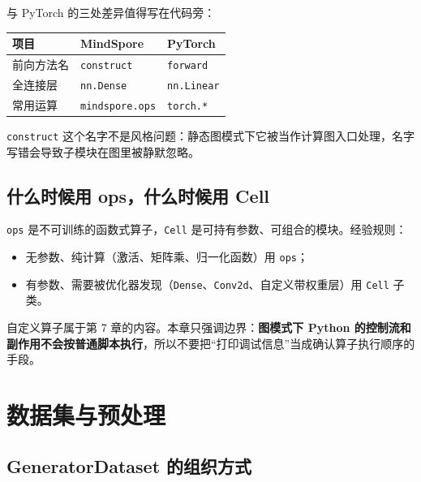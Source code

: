 与 PyTorch 的三处差异值得写在代码旁：

\begin{longtable}[]{@{}lll@{}}
\toprule\noalign{}
项目 & MindSpore & PyTorch \\
\midrule\noalign{}
\endhead
\bottomrule\noalign{}
\endlastfoot
前向方法名 & \passthrough{\lstinline!construct!} &
\passthrough{\lstinline!forward!} \\
全连接层 & \passthrough{\lstinline!nn.Dense!} &
\passthrough{\lstinline!nn.Linear!} \\
常用运算 & \passthrough{\lstinline!mindspore.ops!} &
\passthrough{\lstinline!torch.*!} \\
\end{longtable}

\passthrough{\lstinline!construct!}
这个名字不是风格问题：静态图模式下它被当作计算图入口处理，名字写错会导致子模块在图里被静默忽略。

\subsection{什么时候用 ops，什么时候用
Cell}\label{src-book-chapter5-h12}

\passthrough{\lstinline!ops!}
是不可训练的函数式算子，\passthrough{\lstinline!Cell!}
是可持有参数、可组合的模块。经验规则：

\begin{itemize}
\tightlist
\item
  无参数、纯计算（激活、矩阵乘、归一化函数）用
  \passthrough{\lstinline!ops!}；
\item
  有参数、需要被优化器发现（\passthrough{\lstinline!Dense!}、\passthrough{\lstinline!Conv2d!}、自定义带权重层）用
  \passthrough{\lstinline!Cell!} 子类。
\end{itemize}

自定义算子属于第 7 章的内容。本章只强调边界：\textbf{图模式下 Python
的控制流和副作用不会按普通脚本执行}，所以不要把``打印调试信息''当成确认算子执行顺序的手段。

\section{数据集与预处理}\label{src-book-chapter5-h13}

\subsection{GeneratorDataset 的组织方式}\label{src-book-chapter5-h14}

